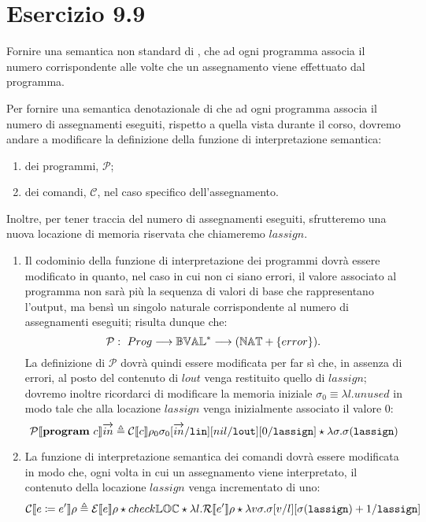 \section*{Esercizio 9.9}
{}
\label{es:9.9}

\begin{tcolorbox}
\cite{mssc2016}
Fornire una semantica non standard di {\SMALL}, che ad ogni programma associa il numero corrispondente alle volte che un assegnamento viene effettuato dal programma.
\end{tcolorbox}
Per fornire una semantica denotazionale di {\SMALL} che ad ogni programma associa il numero di assegnamenti eseguiti, rispetto a quella vista durante il corso, dovremo andare a modificare la definizione della funzione di interpretazione semantica:
\begin{enumerate}
\item dei programmi, $\mathcal{P}$;
\item dei comandi, $\mathcal{C}$, nel caso specifico dell'assegnamento.
\end{enumerate}
Inoltre, per tener traccia del numero di assegnamenti eseguiti, sfrutteremo una nuova locazione di memoria riservata che chiameremo $lassign$.
\begin{enumerate}[leftmargin=*]
\item Il codominio della funzione di interpretazione dei programmi dovrà essere modificato in quanto, nel caso in cui non ci siano errori, il valore associato al programma non sarà più la sequenza di valori di base che rappresentano l'output, ma bensì un singolo naturale corrispondente al numero di assegnamenti eseguiti; risulta dunque che:\[
\mathcal{P}: \ Prog \longrightarrow {\mathbb{BVAL}}^* \longrightarrow ({\mathbb{NAT}} + \{error\}).
\]
La definizione di $\mathcal{P}$ dovrà quindi essere modificata per far sì che, in assenza di errori, al posto del contenuto di $lout$ venga restituito quello di $lassign$; dovremo inoltre ricordarci di modificare la memoria iniziale $\sigma_0 \equiv \lambda{l}.unused$ in modo tale che alla locazione $lassign$ venga inizialmente associato il valore $0$: \[
\mathcal{P}\llbracket \mathbf{program} \ c \rrbracket \overrightarrow{in} \triangleq 
	\mathcal{C} 
		\llbracket c \rrbracket \rho_0 \sigma_0 [\overrightarrow{in}/\texttt{lin}] [nil/\texttt{lout}] [0/\texttt{lassign}]
	\star \lambda{\sigma}.\sigma(\texttt{lassign})
\]
\item La funzione di interpretazione semantica dei comandi {\SMALL} dovrà essere modificata in modo che, ogni volta in cui un assegnamento viene interpretato, il contenuto della locazione $lassign$ venga incrementato di uno: \[
\mathcal{C}\llbracket e \coloneqq e' \rrbracket \rho \triangleq 
	\mathcal{E} \llbracket e \rrbracket \rho
	\star check{\mathbb{LOC}}
	\star \lambda{l}.\mathcal{R} \llbracket e' \rrbracket \rho
	\star \lambda{v}{\sigma}.\sigma[v/l] [\sigma(\texttt{lassign}) + 1 / \texttt{lassign}]
\]
\end{enumerate}